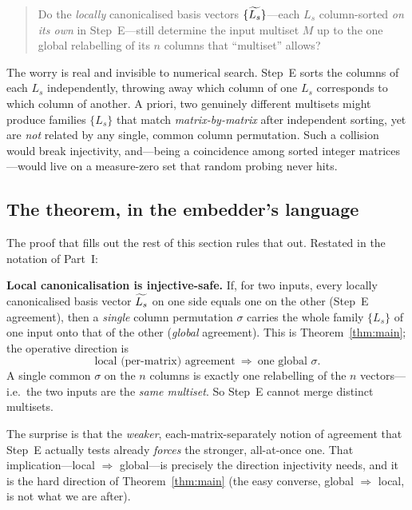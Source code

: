 \begin{quote}
Do the \emph{locally} canonicalised basis vectors $\{\widetilde{L_s}\}$---each
$L_s$ column-sorted \emph{on its own} in Step~E---still determine the input
multiset $M$ up to the one global relabelling of its $n$ columns that
``multiset'' allows?
\end{quote}

The worry is real and invisible to numerical search.  Step~E sorts the columns
of each $L_s$ independently, throwing away which column of one $L_s$ corresponds
to which column of another.  A priori, two genuinely different multisets might
produce families $\{L_s\}$ that match \emph{matrix-by-matrix} after independent
sorting, yet are \emph{not} related by any single, common column permutation.
Such a collision would break injectivity, and---being a coincidence among
sorted integer matrices---would live on a measure-zero set that random probing
never hits.

\subsection*{The theorem, in the embedder's language}

The proof that fills out the rest of this section rules that out.  Restated in the
notation of Part~I:

\begin{tcolorbox}[keybox]
\textbf{Local canonicalisation is injective-safe.}
If, for two inputs, every locally canonicalised basis vector $\widetilde{L_s}$ on
one side equals one on the other (Step~E agreement), then a \emph{single}
column permutation $\sigma$ carries the whole family $\{L_s\}$ of one input onto
that of the other (\emph{global} agreement).  This is
Theorem~\ref{thm:main}; the operative direction is
\[
\text{local (per-matrix) agreement}\ \Longrightarrow\ \text{one global }\sigma.
\]
A single common $\sigma$ on the $n$ columns is exactly one relabelling of the
$n$ vectors---i.e.\ the two inputs are the \emph{same multiset}.  So Step~E
cannot merge distinct multisets.
\end{tcolorbox}

\noindent
The surprise is that the \emph{weaker}, each-matrix-separately notion of
agreement that Step~E actually tests already \emph{forces} the stronger,
all-at-once one.  That implication---local $\Rightarrow$ global---is precisely
the direction injectivity needs, and it is the hard direction of
Theorem~\ref{thm:main} (the easy converse, global $\Rightarrow$ local, is not
what we are after).

